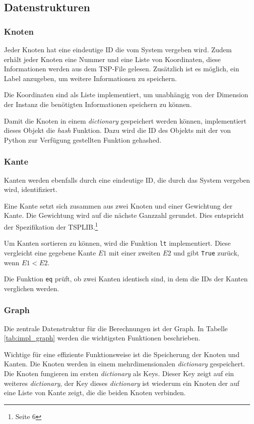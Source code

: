 \documentclass[11pt,a4paper]{article}
\begin{document}
\subsection{Datenstrukturen}
\subsubsection{Knoten}
Jeder Knoten hat eine eindeutige ID die vom System vergeben wird. Zudem erhält jeder Knoten eine Nummer und eine Liste von Koordinaten, diese Informationen werden aus dem TSP-File gelesen. Zusätzlich ist es möglich, ein Label anzugeben, um weitere Informationen zu speichern.

Die Koordinaten sind als Liste implementiert, um unabhängig von der Dimension der Instanz die benötigten Informationen speichern zu können.

Damit die Knoten in einem \emph{dictionary} gespeichert werden können, implementiert dieses Objekt die \emph{hash} Funktion. Dazu wird die ID des Objekts mit der von Python zur Verfügung gestellten Funktion gehashed.

\subsubsection{Kante}
Kanten werden ebenfalls durch eine eindeutige ID, die durch das System vergeben wird, identifiziert.

Eine Kante setzt sich zusammen aus zwei Knoten und einer Gewichtung der Kante. Die Gewichtung wird auf die nächste Ganzzahl gerundet. Dies entspricht der Spezifikation der TSPLIB.\footnote{\cite{reinelt95} Seite 6}

Um Kanten sortieren zu können, wird die Funktion \texttt{\textunderscore\textunderscore lt\textunderscore\textunderscore} implementiert. Diese vergleicht eine gegebene Kante $E1$ mit einer zweiten $E2$ und gibt \texttt{True} zurück, wenn $E1 < E2$.

Die Funktion \texttt{\textunderscore\textunderscore eq\textunderscore\textunderscore} prüft, ob zwei Kanten identisch sind, in dem die IDs der Kanten verglichen werden.

\subsubsection{Graph}
Die zentrale Datenstruktur für die Berechnungen ist der Graph. In Tabelle \ref{tab:impl_graph} werden die wichtigsten Funktionen beschrieben.

Wichtige für eine effiziente Funktionsweise ist die Speicherung der Knoten und Kanten. Die Knoten werden in einem mehrdimensionalen \emph{dictionary} gespeichert. Die Knoten fungieren im ersten \emph{dictionary} als Keys. Dieser Key zeigt auf ein weiteres \emph{dictionary}, der Key dieses \emph{dictionary} ist wiederum ein Knoten der auf eine Liste von Kante zeigt, die die beiden Knoten verbinden.
\end{document}
